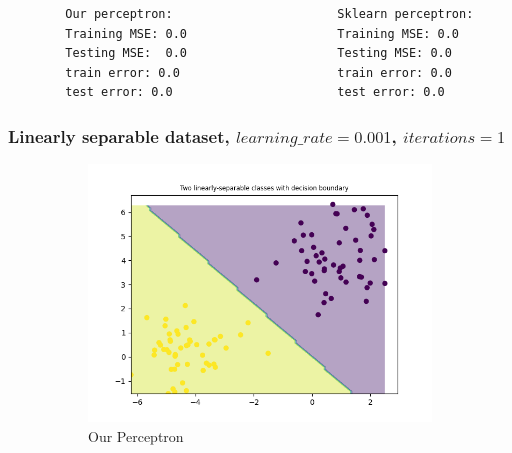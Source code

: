     \begin{verbatim}    
        Our perceptron:                       Sklearn perceptron:
        Training MSE: 0.0                     Training MSE: 0.0
        Testing MSE:  0.0                     Testing MSE: 0.0
        train error: 0.0                      train error: 0.0
        test error: 0.0                       test error: 0.0
    \end{verbatim}

    \subsubsection{Linearly separable dataset, $learning\_rate=0.001$, $iterations=1$}

    \begin{figure}[ht]
        \centering
        \begin{subfigure}{0.4\textwidth}
            \centering
            \includegraphics[width=\linewidth]{code/plots/our_perceptron_LR0.001_ITER1_dataset_loaddata}
            \caption{Our Perceptron}
            \label{fig:image1}
        \end{subfigure}
        \hspace{2cm} %
        \begin{subfigure}{0.4\textwidth}
            \centering

\end{subfigure}
\end{figure}
